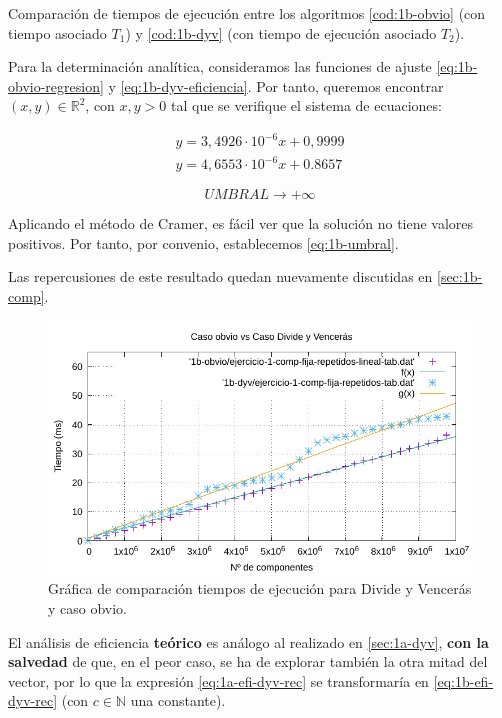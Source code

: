 \begin{table}
    \caption{Comparación de tiempos de ejecución entre los algoritmos \ref{cod:1b-obvio} 
    (con tiempo asociado $T_1$) y \ref{cod:1b-dyv} (con tiempo de
    ejecución asociado $T_2$).}
    \label{tab:1b-comp}
\end{table}

Para la determinación analítica, consideramos las funciones de ajuste \ref{eq:1b-obvio-regresion} y \ref{eq:1b-dyv-eficiencia}. Por tanto,
queremos encontrar $(x,y) \in \mathbb R ^2$, con $x,y>0$ tal que se 
verifique el sistema de ecuaciones:

\begin{eqnarray}
	 y = 3,4926 \cdot 10 ^{-6} x + 0,9999 \\
	 y = 4,6553 \cdot 10^{-6} x + 0.8657
\end{eqnarray} 

\begin{equation}
    \boxed{UMBRAL \rightarrow +\infty}
    \label{eq:1b-umbral}
\end{equation}

Aplicando el método de Cramer, es fácil ver que la solución no tiene valores
positivos. Por tanto, por convenio, establecemos \ref{eq:1b-umbral}.

Las repercusiones de este resultado quedan nuevamente discutidas en \ref{sec:1b-comp}.

\begin{figure}[h]
    \centering
    \includegraphics[scale=0.76]{img/e1b-comp.pdf}
    \caption{Gráfica de comparación tiempos de ejecución para Divide y Vencerás y caso obvio.}
    \label{fig:1b-comp}
\end{figure}


El análisis de eficiencia \textbf{teórico} es análogo al realizado en \ref{sec:1a-dyv}, \textbf{con la salvedad} de que, en el
peor caso, se ha de explorar también la otra mitad del vector, por lo que la expresión \ref{eq:1a-efi-dyv-rec}
se transformaría en \ref{eq:1b-efi-dyv-rec} (con $c \in \mathbb N$ una constante). 

